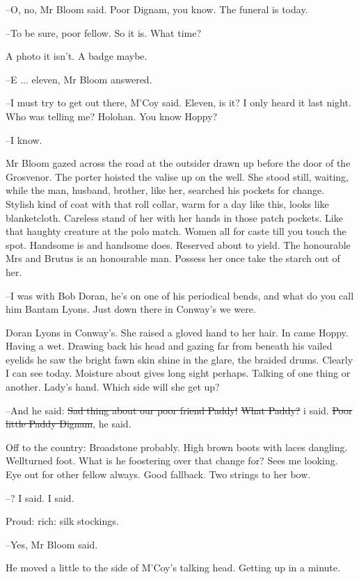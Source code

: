 --O, no, Mr Bloom said.
Poor Dignam, you know.
The funeral is today.

--To be sure, poor fellow.
So it is.
What time?

A photo it isn't.
A badge maybe.

--E ... eleven,
Mr Bloom answered.

--I must try to get out there,
M'Coy said.
Eleven, is it?
I only heard it last night.
Who was telling me?
Holohan.
You know Hoppy?

--I know.

Mr Bloom gazed across the road at the outsider
drawn up before the door of the Grosvenor.
The porter hoisted the valise up on the well.
She stood still, waiting,
while the man, husband, brother,
like her,
searched his pockets for change.
Stylish kind of coat with that roll collar,
warm for a day like this,
looks like blanketcloth.
Careless stand of her
with her hands in those patch pockets.
Like that haughty creature at the polo match.
Women all for caste till you touch the spot.
Handsome is and handsome does.
Reserved about to yield.
The honourable Mrs
and Brutus is an honourable man.
Possess her once
take the starch out of her.

--I was with Bob Doran,
he's on one of his periodical bends,
and what do you call him Bantam Lyons.
Just down there in Conway's
we were.

Doran Lyons in Conway's.
She raised a gloved hand to her hair.
In came Hoppy.
Having a wet.
Drawing back his head
and gazing far from beneath
his vailed eyelids
he saw the bright fawn skin shine in the glare,
the braided drums.
Clearly I can see today.
Moisture about gives long sight perhaps.
Talking of one thing or another.
Lady's hand.
Which side will she get up?

--And he said:
\sout{Sad thing about our poor friend Paddy!}
\sout{What Paddy?} i said.
\sout{Poor little Paddy Dignam},
he said.

Off to the country:
Broadstone probably.
High brown boots with laces dangling.
Wellturned foot.
What is he foostering over that change for?
Sees me looking.
Eye out for other fellow always.
Good fallback.
Two strings to her bow.

--?
I said.
I said.

Proud:
rich:
silk stockings.

--Yes,
Mr Bloom said.

He moved a little to the side of M'Coy's talking head.
Getting up in a minute.

